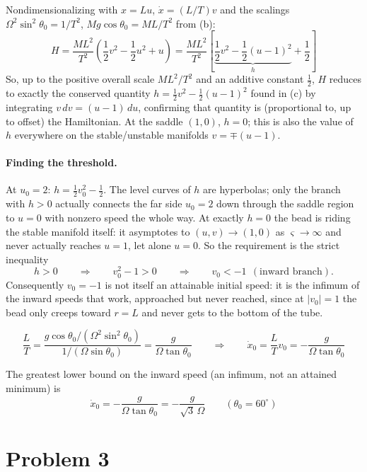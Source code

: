 \documentclass[11pt]{article}
\begin{document}
Nondimensionalizing with $x=Lu$, $\dot x=(L/T)v$ and the scalings $\Omega^2\sin^2\theta_0=1/T^2$, $Mg\cos\theta_0=ML/T^2$ from (b):
\[
H=\frac{ML^2}{T^2}\left(\frac12v^2-\frac12u^2+u\right)=\frac{ML^2}{T^2}\left[\underbrace{\frac12v^2-\frac12(u-1)^2}_{h}+\frac12\right]
\]
So, up to the positive overall scale $ML^2/T^2$ and an additive constant $\tfrac12$, $H$ reduces to exactly the conserved quantity $h=\frac12v^2-\frac12(u-1)^2$ found in (c) by integrating $v\,dv=(u-1)\,du$, confirming that quantity is (proportional to, up to offset) the Hamiltonian. At the saddle $(1,0)$, $h=0$; this is also the value of $h$ everywhere on the stable/unstable manifolds $v=\mp(u-1)$.

\paragraph{Finding the threshold.} At $u_0=2$: $h=\frac12v_0^2-\frac12$. The level curves of $h$ are hyperbolas; only the branch with $h>0$ actually connects the far side $u_0=2$ down through the saddle region to $u=0$ with nonzero speed the whole way. At exactly $h=0$ the bead is riding the stable manifold itself: it asymptotes to $(u,v)\to(1,0)$ as $\varsigma\to\infty$ and never actually reaches $u=1$, let alone $u=0$. So the requirement is the strict inequality
\[
h>0 \qquad\Longrightarrow\qquad v_0^2-1>0 \qquad\Longrightarrow\qquad v_0<-1 \ \ (\text{inward branch}).
\]
Consequently $v_0=-1$ is not itself an attainable initial speed: it is the infimum of the inward speeds that work, approached but never reached, since at $|v_0|=1$ the bead only creeps toward $r=L$ and never gets to the bottom of the tube.

\[
\frac{L}{T}=\frac{g\cos\theta_0/(\Omega^2\sin^2\theta_0)}{1/(\Omega\sin\theta_0)}=\frac{g}{\Omega\tan\theta_0}
\qquad\Longrightarrow\qquad
\dot x_0=\frac{L}{T}v_0=-\frac{g}{\Omega\tan\theta_0}
\]

\begin{result}
The greatest lower bound on the inward speed (an infimum, not an attained minimum) is
\[
\dot x_0=-\frac{g}{\Omega\tan\theta_0}=-\frac{g}{\sqrt3\,\Omega} \qquad (\theta_0=60^\circ)
\]
\end{result}


\newpage
\section*{Problem 3}
\end{document}
